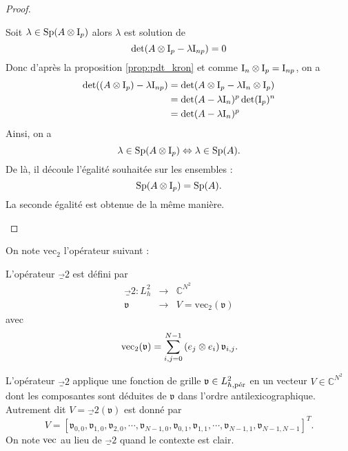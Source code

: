 \begin{proof}
\begin{itemize}
Soit $\lambda \in \Sp(A \otimes \I_p)$ alors $\lambda$ est solution de 
\begin{equation}
\det(A \otimes \I_p - \lambda \I_{np}) = 0
\end{equation}
Donc d'après la proposition \ref{prop:pdt_kron} et comme $\I_n \otimes \I_p = \I_{np}$, on a
\begin{align*}
\det((A \otimes \I_p)-\lambda \I_{np}) & = \det(A \otimes \I_p - \lambda \I_n \otimes \I_p) \\
	& = \det(A - \lambda \I_n)^p \det(\I_p)^n \\
	& = \det(A - \lambda \I_n)^p
\end{align*}
Ainsi, on a 
\begin{equation*}
\lambda \in \Sp(A\otimes \I_p) \Leftrightarrow \lambda \in \Sp(A).
\end{equation*}	
De là, il découle l'égalité souhaitée sur les ensembles :
\begin{equation}
\Sp(A \otimes \I_p) = \Sp(A).
\end{equation}
La seconde égalité est obtenue de la même manière.
\end{itemize}
\end{proof}

On note $\text{vec}_2$ l'opérateur suivant :

\begin{definition}
L'opérateur $\vec_2$ est défini par
\begin{equation}
\begin{array}{rcl}
\vec_2 : L^2_h & \longrightarrow & \mathbb{C}^{N^2}\\
\mathfrak{v} & \longrightarrow & V = \text{vec}_2(\mathfrak{v})
\end{array}
\end{equation}
avec
\begin{equation}
\text{vec}_2(\mathfrak{v}) = \gsum_{i,j=0}^{N-1} \left( e_j \otimes e_i \right)\mathfrak{v}_{i,j}.
\end{equation}
\end{definition}

L'opérateur $\vec_2$ applique une fonction de grille $\mathfrak{v} \in L^2_{h,\per}$ en un vecteur $V \in \mathbb{C}^{N^2}$ dont les composantes sont déduites de $\mathfrak{v}$ dans l'ordre antilexicographique. Autrement dit $V = \vec_2(\mathfrak{v})$ est donné par
\begin{equation}
V=[\mathfrak{v}_{0,0}, \mathfrak{v}_{1,0}, \mathfrak{v}_{2,0}, \cdots, \mathfrak{v}_{N-1,0}, \mathfrak{v}_{0,1}, \mathfrak{v}_{1,1}, \cdots,  \mathfrak{v}_{N-1,1}, \mathfrak{v}_{N-1,N-1}]^T.
\end{equation}
On note $\vec$ au lieu de $\vec_2$ quand le contexte est clair.


